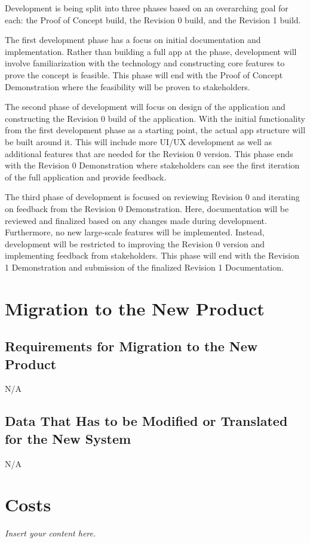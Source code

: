\documentclass[12pt]{article}
\newcommand{\lips}{\textit{Insert your content here.}}
\begin{document}
Development is being split into three phases based on an overarching goal for each: the Proof of Concept build,
the Revision 0 build, and the Revision 1 build. \par

The first development phase has a focus on initial documentation and implementation.
Rather than building a full app at the phase, development will involve familiarization with
the technology and constructing core features to prove the concept is feasible. This phase will
end with the Proof of Concept Demonstration where the feasibility will be proven to stakeholders. \par

The second phase of development will focus on design of the application and constructing the
Revision 0 build of the application. With the initial functionality from the first development phase as
a starting point, the actual app structure will be built around it. This will include more UI/UX
development as well as additional features that are needed for the Revision 0 version. This phase ends
with the Revision 0 Demonstration where stakeholders can see the first iteration of the full application
and provide feedback. \par

The third phase of development is focused on reviewing Revision 0 and iterating on feedback from the
Revision 0 Demonstration. Here, documentation will be reviewed and finalized based on any changes made
during development. Furthermore, no new large-scale features will be implemented. Instead, development
will be restricted to improving the Revision 0 version and implementing feedback from stakeholders. This phase
will end with the Revision 1 Demonstration and submission of the finalized Revision 1 Documentation.

\section{Migration to the New Product}
\subsection{Requirements for Migration to the New Product}
N/A
\subsection{Data That Has to be Modified or Translated for the New System}
N/A

\section{Costs}
\lips
\end{document}
